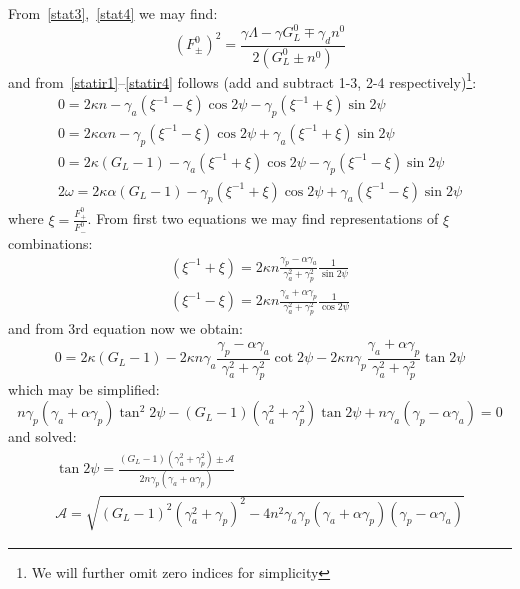 \documentclass[12pt, notitlepage]{report}
\begin{document}
From~\eqref{stat3},~\eqref{stat4} we may find:
\begin{equation}
	\label{Fpm}
	(F_\pm^0)^2 = \frac{\gamma \Lambda - \gamma G^0_L \mp \gamma_d n^0}{2(G^0_L\pm n^0)}
\end{equation}
and from~\eqref{statir1}--\eqref{statir4} follows (add and subtract 1-3, 2-4 respectively)\footnote{We will further omit zero indices for simplicity}:
\begin{gather}
	0 = 2\kappa n - \gamma_a \left( \xi^{-1} - \xi \right)\cos 2\psi - \gamma_p \left(\xi^{-1} + \xi\right)\sin 2\psi \\
	0 = 2\kappa \alpha n  - \gamma_p \left(\xi^{-1} - \xi\right)\cos 2\psi + \gamma_a \left( \xi^{-1} + \xi \right)\sin 2\psi \\
	0 = 2\kappa\left(G_L - 1 \right) - \gamma_a \left(\xi^{-1} + \xi\right)\cos 2\psi - \gamma_p \left( \xi^{-1} - \xi \right)\sin 2\psi \\
	2\omega = 2\kappa \alpha \left(G_L - 1\right) - \gamma_p \left(\xi^{-1} + \xi\right)\cos 2\psi + \gamma_a \left( \xi^{-1} - \xi \right)\sin 2\psi
\end{gather}
where $\xi = \frac{F^0_+}{F^0_-}$. From first two equations we may find representations of $\xi$ combinations:
\begin{gather}
	\left(\xi^{-1} + \xi\right) = 2\kappa n \frac{\gamma_p - \alpha\gamma_a}{\gamma_a^2 + \gamma_p^2}\frac{1}{\sin2\psi} \\
	\left(\xi^{-1} - \xi\right) = 2\kappa n \frac{\gamma_a + \alpha\gamma_p}{\gamma_a^2 + \gamma_p^2}\frac{1}{\cos 2\psi}	
\end{gather}
and from 3rd equation now we obtain:
\begin{equation}
	\label{tanraw}
	0 = 2\kappa\left(G_L - 1 \right) -  2\kappa n\gamma_a \frac{\gamma_p - \alpha\gamma_a}{\gamma_a^2 + \gamma_p^2}\cot 2\psi -  2\kappa n\gamma_p \frac{\gamma_a + \alpha\gamma_p}{\gamma_a^2 + \gamma_p^2}\tan 2\psi
\end{equation}
which may be simplified:
\begin{equation}
n\gamma_p\left(\gamma_a + \alpha\gamma_p\right) \tan^2 2\psi - \left(G_L - 1\right)\left(\gamma_a^2 + \gamma_p^2\right)\tan 2\psi + n\gamma_a\left(\gamma_p-\alpha\gamma_a\right) = 0
\end{equation}
and solved:
\begin{gather}
	\tan 2\psi = \frac{(G_L-1)(\gamma_a^2 + \gamma_p^2) \pm \mathcal{A}}{2n\gamma_p(\gamma_a+\alpha\gamma_p)}\\
	\mathcal{A} = \sqrt{(G_L-1)^2(\gamma_a^2+\gamma_p)^2 - 4n^2\gamma_a\gamma_p(\gamma_a+\alpha\gamma_p)(\gamma_p - \alpha\gamma_a)}
\end{gather}
\end{document}
